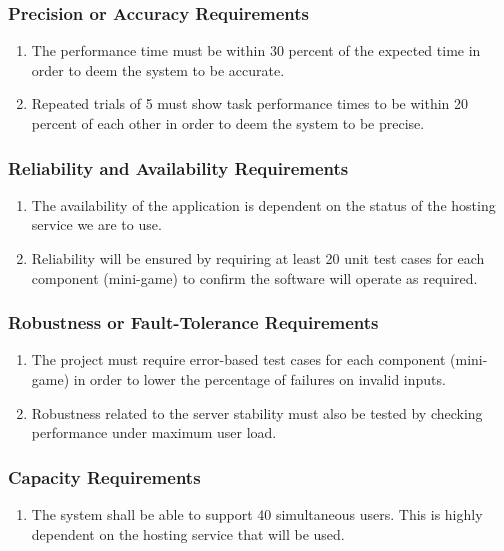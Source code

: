\documentclass[]{article}
\begin{document}
\subsubsection{Precision or Accuracy Requirements}
\label{ssub:precision_or_accuracy_requirements}
\begin{enumerate}[{PR}1. ]
	\item The performance time must be within 30 percent of the expected time in order to deem the system to be accurate. 
	\item Repeated trials of 5 must show task performance times to be within 20 percent of each other in order to deem the system to be precise.
\end{enumerate}

\subsubsection{Reliability and Availability Requirements}
\label{ssub:reliability_and_availability_requirements}
\begin{enumerate}[{PR}1. ]
	\item The availability of the application is dependent on the status of the hosting service we are to use. 
	\item Reliability will be ensured by requiring at least 20 unit test cases for each component (mini-game) to confirm the software will operate as required.
\end{enumerate}

\subsubsection{Robustness or Fault-Tolerance Requirements}
\label{ssub:robustness_or_fault_tolerance_requirements}
\begin{enumerate}[{PR}1. ]
	\item The project must require error-based test cases for each component (mini-game) in order to lower the percentage of failures on invalid inputs. 
	\item Robustness related to the server stability must also be tested by checking performance under maximum user load.
\end{enumerate}

\subsubsection{Capacity Requirements}
\label{ssub:capacity_requirements}
\begin{enumerate}[{PR}1. ]
	\item The system shall be able to support 40 simultaneous users. This is highly dependent on the hosting service that will be used.
\end{enumerate}
\end{document}
